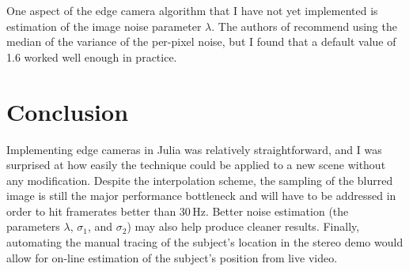 \documentclass{article}
\begin{document}
One aspect of the edge camera algorithm that I have not yet implemented is estimation of the image noise parameter $\lambda$. The authors of \cite{bouman_turningcornerscameras2017} recommend using the median of the variance of the per-pixel noise, but I found that a default value of 1.6 worked well enough in practice. 

\section{Conclusion}

Implementing edge cameras in Julia was relatively straightforward, and I was surprised at how easily the technique could be applied to a new scene without any modification. Despite the interpolation scheme, the sampling of the blurred image is still the major performance bottleneck and will have to be addressed in order to hit framerates better than 30\,Hz. Better noise estimation (the parameters $\lambda$, $\sigma_1$, and $\sigma_2$) may also help produce cleaner results. Finally, automating the manual tracing of the subject's location in the stereo demo would allow for on-line estimation of the subject's position from live video.




\end{document}
